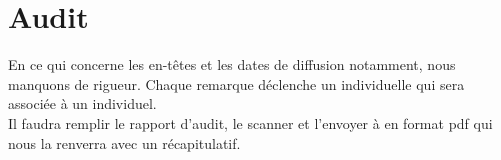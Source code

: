 \documentclass [a4paper] {article}
\begin{document}
\section{Audit}
En ce qui concerne les en-têtes et les dates de diffusion notamment, nous manquons de rigueur. Chaque remarque déclenche un \FFT{} individuelle qui sera associée à un \OC{} individuel. \\
Il faudra remplir le rapport d'audit, le scanner et l'envoyer à \nomTuteurQualite{} en format pdf qui nous la renverra avec un récapitulatif.
\end{document}
